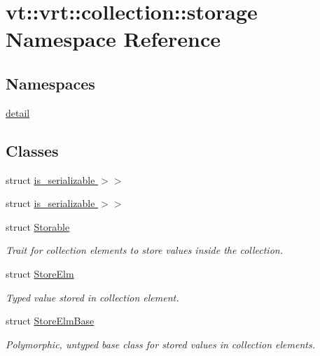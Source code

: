 \hypertarget{namespacevt_1_1vrt_1_1collection_1_1storage}{}\section{vt\+:\+:vrt\+:\+:collection\+:\+:storage Namespace Reference}
\label{namespacevt_1_1vrt_1_1collection_1_1storage}
\subsection*{Namespaces}
\begin{DoxyCompactItemize}
\item 
 \hyperlink{namespacevt_1_1vrt_1_1collection_1_1storage_1_1detail}{detail}
\end{DoxyCompactItemize}
\subsection*{Classes}
\begin{DoxyCompactItemize}
\item 
struct \hyperlink{structvt_1_1vrt_1_1collection_1_1storage_1_1_store_elm_3_01_t_00_01typename_01std_1_1enable__if_947e0655769addb625fb511f777768bd}{is\+\_\+serializable $>$$>$}
\item 
struct \hyperlink{structvt_1_1vrt_1_1collection_1_1storage_1_1_store_elm_3_01_t_00_01typename_01std_1_1enable__if_f645d7011e081ebef1092328b0917bfc}{is\+\_\+serializable $>$$>$}
\item 
struct \hyperlink{structvt_1_1vrt_1_1collection_1_1storage_1_1_storable}{Storable}
\begin{DoxyCompactList}\small\item\em Trait for collection elements to store values inside the collection. \end{DoxyCompactList}\item 
struct \hyperlink{structvt_1_1vrt_1_1collection_1_1storage_1_1_store_elm}{Store\+Elm}
\begin{DoxyCompactList}\small\item\em Typed value stored in collection element. \end{DoxyCompactList}\item 
struct \hyperlink{structvt_1_1vrt_1_1collection_1_1storage_1_1_store_elm_base}{Store\+Elm\+Base}
\begin{DoxyCompactList}\small\item\em Polymorphic, untyped base class for stored values in collection elements. \end{DoxyCompactList}\end{DoxyCompactItemize}
